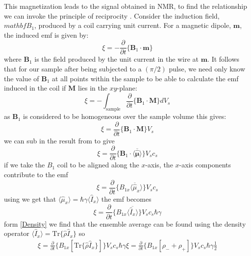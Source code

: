 This magnetization leads to the signal obtained in NMR, to find the relationship we can
invoke the principle of reciprocity \citep{Hoult:1976dw}. Consider the induction
field, $mathbf{B}_1$, produced by a coil carrying unit current. For a magnetic dipole, $\mathbf{m}$,
the induced emf is given by:
\begin{equation}
  \xi = -\frac{\partial}{\partial{t}}\{\mathbf{B}_1\cdot\mathbf{m}\}
\end{equation}
where $\mathbf{B}_1$ is the field produced by the unit current in the wire at $\mathbf{m}$. It follows
that for our sample after being subjected to a $(\pi/2)$ pulse, we need only know the value of
$\mathbf{B}_1$ at all points within the sample to be able to calculate the emf induced
in the coil if $\mathbf{M}$ lies in the $xy$-plane:
\begin{equation}
  \xi = -\int_{\text{sample}} \frac{\partial}{\partial{t}}\{\mathbf{B}_1\cdot\mathbf{M}\} dV_s
\end{equation}
as $\mathbf{B}_1$ is considered to be homogeneous over the sample volume this gives:
\begin{equation}
  \xi = \frac{\partial}{\partial{t}}\{\mathbf{B}_1\cdot\mathbf{M}\}V_s
\end{equation}
we can sub in the result from  to give
\begin{equation}
  \xi = \frac{\partial}{\partial{t}}\{\mathbf{B}_1\cdot\langle\overbar{\hat{\boldsymbol{\mu}}}\rangle\}V_sc_s
\end{equation}
if we take the $B_1$ coil to be aligned along the $x$-axis, the $x$-axis components contribute to the emf
\begin{equation}
  \xi = \frac{\partial}{\partial{t}}\{B_{1x}\langle\overbar{\hat{\mu}}_x\rangle\}V_sc_s
\end{equation}
using  we get that $\langle\hat{\mu}_x\rangle = \hbar\gamma\langle{\hat{I}_x}\rangle$
the emf becomes
\begin{equation}
  \xi = \frac{\partial}{\partial{t}}\{B_{1x}\langle\overbar{\hat{I}_x}\rangle\}V_sc_s\hbar\gamma
\end{equation}
form \ref{Density} we find that the ensemble average can be found using the density operator
$\langle{\hat{I}_x}\rangle = \text{Tr}\{\hat{\rho}\hat{I}_x\}$ so
\begin{align}
  \xi = \frac{\partial}{\partial{t}}\{B_{1x}[\text{Tr}\{\hat{\rho}\hat{I}_x\}]\}V_sc_s\hbar\gamma
  \xi = \frac{\partial}{\partial{t}}\{B_{1x}[\rho_- + \rho_+]\}V_sc_s\hbar\gamma\frac{1}{2}
\end{align}
